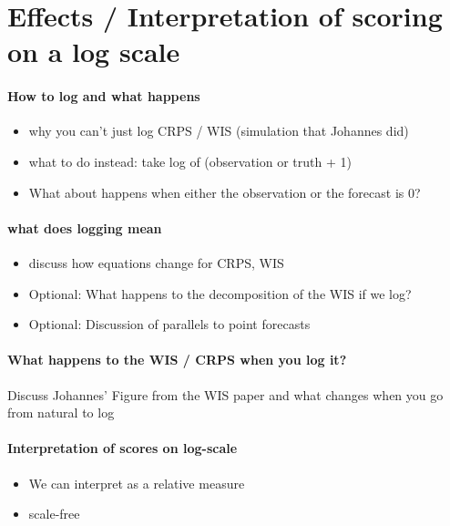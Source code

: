 \documentclass{article}
\begin{document}
\section{Effects / Interpretation of scoring on a log scale}

\paragraph{How to log and what happens}
\begin{itemize}
    \item why you can't just log CRPS / WIS (simulation that Johannes did)
    \item what to do instead: take log of (observation or truth + 1) 
    \item What about happens when either the observation or the forecast is 0?
\end{itemize}

\paragraph{what does logging mean}
\begin{itemize}
    \item discuss how equations change for CRPS, WIS
    \item Optional: What happens to the decomposition of the WIS if we log?
    \item Optional: Discussion of parallels to point forecasts \\
\end{itemize}


\paragraph{What happens to the WIS / CRPS when you log it?}
Discuss Johannes' Figure from the WIS paper and what changes when you go from natural to log \\

\paragraph{Interpretation of scores on log-scale}

\begin{itemize}
    \item We can interpret as a relative measure
    \item scale-free
\end{itemize}
\end{document}
